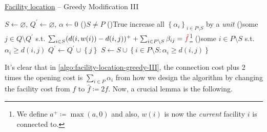 \begin{algorithm}[H]\label{algo:facility-location-greedy-III}
	\DontPrintSemicolon
	\caption{\hyperref[prb:facility-location]{Facility location} -- Greedy Modification III}
	\BlankLine
	\(S\gets \varnothing \), \(Q^\prime \gets \varnothing \), \(\alpha \gets 0\) 
	\;
	\While(){\(S \neq P\)}{
	\While(){\textsf{True}}{
	increase all \(\left\{ \alpha _i \right\}_{i\in P\setminus S} \) by a \emph{unit}\;
	\If(){some \(j\in Q\setminus Q^\prime \) s.t. \(\sum_{i\in S} (d(i, w(i)) - d(i, j))^+ + \sum_{i\in P\setminus S} \beta _{ij} = \mathcolor{red}{\hat{f}}\)\footnote{We define \(a^+ \coloneqq \max (a, 0)\) and also, \(w(i)\) is now the \emph{current} facility \(i\) is connected to.}}{
			\Break
		}
		\If(){some \(i\in P\setminus S\) s.t. \(\alpha_i \geq d(i, j)\)}{
			\Break
		}
	}
	\(Q^\prime \gets Q^\prime  \cup \left\{ j \right\} \)
	\(S\gets S \cup \left\{ i\in P\setminus S\colon \alpha _i \geq d(i, j)\right\} \)
	}
	\;
\end{algorithm}

It's clear that in \autoref{algo:facility-location-greedy-III}, the connection cost plus \(2\) times the opening cost is \(\sum_{i\in P} \alpha _i\) from how we design the algorithm by changing the facility cost from \(f\) to \(\hat{f} \coloneqq 2f\). Now, a crucial lemma is the following.

